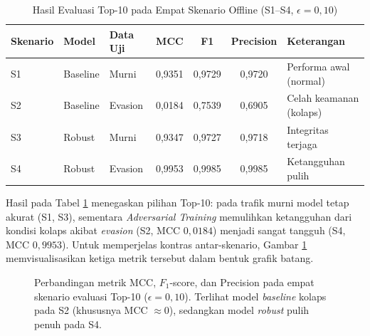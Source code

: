\documentclass[11pt, a4paper]{article}
\begin{document}
\begin{table}[htbp]
\centering
\caption{Hasil Evaluasi Top-10 pada Empat Skenario Offline (S1--S4, $\epsilon = 0{,}10$)}
\label{tab:s1s4_offline}
\small
\begin{tabularx}{\linewidth}{@{} l l l c c c X @{}}
\toprule
\textbf{Skenario} & \textbf{Model} & \textbf{Data Uji} & \textbf{MCC} & \textbf{F1} & \textbf{Precision} & \textbf{Keterangan} \\ \midrule
S1 & Baseline & Murni & 0,9351 & 0,9729 & 0,9720 & Performa awal (normal) \\ \addlinespace
S2 & Baseline & Evasion & 0,0184 & 0,7539 & 0,6905 & Celah keamanan (kolaps) \\ \addlinespace
S3 & Robust & Murni & 0,9347 & 0,9727 & 0,9718 & Integritas terjaga \\ \addlinespace
S4 & Robust & Evasion & 0,9953 & 0,9985 & 0,9985 & Ketangguhan pulih \\ \bottomrule
\end{tabularx}
\end{table}

Hasil pada Tabel \ref{tab:s1s4_offline} menegaskan pilihan Top-10: pada trafik murni model tetap akurat (S1, S3), sementara \textit{Adversarial Training} memulihkan ketangguhan dari kondisi kolaps akibat \textit{evasion} (S2, MCC $0{,}0184$) menjadi sangat tangguh (S4, MCC $0{,}9953$). Untuk memperjelas kontras antar-skenario, Gambar \ref{fig:s1s4_bar} memvisualisasikan ketiga metrik tersebut dalam bentuk grafik batang.

\begin{figure}[htbp]
\centering
{}
\caption{Perbandingan metrik MCC, $F_1$-score, dan Precision pada empat skenario evaluasi Top-10 ($\epsilon = 0{,}10$). Terlihat model \textit{baseline} kolaps pada S2 (khususnya MCC $\approx 0$), sedangkan model \textit{robust} pulih penuh pada S4.}
\label{fig:s1s4_bar}
\end{figure}
\end{document}
